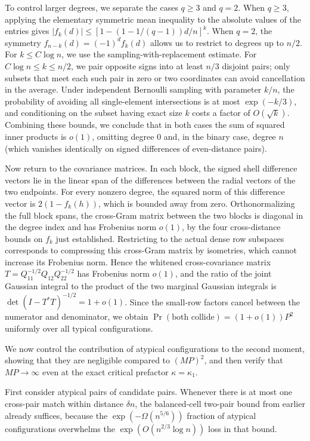 To control larger degrees, we separate the cases \(q\ge3\) and \(q=2\). When \(q\ge3\), applying the elementary symmetric mean inequality to the absolute values of the entries gives \(|f_k(d)|\le [1-(1-1/(q-1))d/n]^k\). When \(q=2\), the symmetry \(f_{n-k}(d)=(-1)^df_k(d)\) allows us to restrict to degrees up to \(n/2\). For \(k\le C\log n\), we use the sampling-with-replacement estimate. For \(C\log n\le k\le n/2\), we pair opposite signs into at least \(n/3\) disjoint pairs; only subsets that meet each such pair in zero or two coordinates can avoid cancellation in the average. Under independent Bernoulli sampling with parameter \(k/n\), the probability of avoiding all single-element intersections is at most \(\exp(-k/3)\), and conditioning on the subset having exact size \(k\) costs a factor of \(O(\sqrt k)\). Combining these bounds, we conclude that in both cases the sum of squared inner products is \(o(1)\), omitting degree 0 and, in the binary case, degree \(n\) (which vanishes identically on signed differences of even-distance pairs).

Now return to the covariance matrices. In each block, the signed shell difference vectors lie in the linear span of the differences between the radial vectors of the two endpoints. For every nonzero degree, the squared norm of this difference vector is \(2(1-f_k(h))\), which is bounded away from zero. Orthonormalizing the full block spans, the cross-Gram matrix between the two blocks is diagonal in the degree index and has Frobenius norm \(o(1)\), by the four cross-distance bounds on \(f_k\) just established. Restricting to the actual dense row subspaces corresponds to compressing this cross-Gram matrix by isometries, which cannot increase its Frobenius norm. Hence the whitened cross-covariance matrix \(T=Q_{11}^{-1/2}Q_{12}Q_{22}^{-1/2}\) has Frobenius norm \(o(1)\), and the ratio of the joint Gaussian integral to the product of the two marginal Gaussian integrals is \(\det(I-T^*T)^{-1/2}=1+o(1)\). Since the small-row factors cancel between the numerator and denominator, we obtain \(\Pr(\text{both collide})=(1+o(1))P^2\) uniformly over all typical configurations.

We now control the contribution of atypical configurations to the second moment, showing that they are negligible compared to \((MP)^2\), and then verify that \(MP\to\infty\) even at the exact critical prefactor \(\kappa=\kappa_1\).

First consider atypical pairs of candidate pairs. Whenever there is at most one cross-pair match within distance \(\delta n\), the balanced-cell two-pair bound from earlier already suffices, because the \(\exp(-\Omega(n^{5/6}))\) fraction of atypical configurations overwhelms the \(\exp(O(n^{2/3}\log n))\) loss in that bound.

